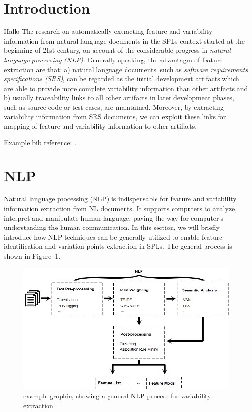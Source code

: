 \documentclass[graybox]{svmult}
\begin{document}
\section{Introduction}
\label{sec:intro}
Hallo
The research on automatically extracting feature and variability information from natural language documents in the SPLs context started at the beginning of 21st century, on account of the considerable progress in \emph{natural language processing (NLP)}. Generally speaking, the advantages of feature extraction are that: a) natural language documents, such as \emph{software requirements specifications (SRS)}, can be regarded as the initial development artifacts which are able to provide more complete variability information than other artifacts and b) usually traceability links to all other artifacts in later development phases, such as source code or test cases, are maintained. Moreover, by extracting variability information from SRS documents, we can exploit these links for mapping of feature and variability information to other artifacts.


Example bib reference: \cite{VidyaSagarA14}. \\

\section{NLP}
\label{sec:nlp}

Natural language processing (NLP) is indispensable for feature and variability information extraction from NL documents. It supports computers to analyze, interpret and manipulate human language, paving the way for computer's understanding the human communication. In this section, we will briefly introduce how NLP techniques can be generally utilized to enable feature identification and variation points extraction in SPLs. The general process is shown in Figure~\ref{fig:nlp-general}.

\begin{figure}
\includegraphics[scale=0.55]{fig_nlp2}
\caption{example graphic, showing a general NLP process for variability extraction}
\label{fig:nlp-general}
\end{figure}
\end{document}
